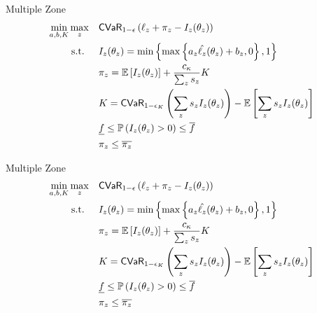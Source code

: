 \documentclass{beamer}
\begin{document}
\begin{frame}{Multiple Zone}
    \begin{align}
        \min_{a,b,K} \max_z &\quad {\sf CVaR}_{1-\epsilon}\left (\ell_z  + \pi_z - I_z(\theta_z) \right )\\
        \text{s.t.   } &\quad I_z(\theta_z) = \min \left \{ \max \left \{ a_z\hat{\ell_z}(\theta_z) + b_z,0 \right \},1 \right \} \\
        &\quad \pi_z  = \mathbb{E}\left [ I_z(\theta_z) \right ] + \frac{c_{\kappa}}{\sum_z s_z} K\\
        &\quad K =  {\sf CVaR}_{1-\epsilon_K} \left ( \sum_z s_z I_z(\theta_z) \right ) - \mathbb{E}\left [ \sum_z s_zI_z(\theta_z) \right ] \\
        & \quad \underline{f} \leq \mathbb{P}\left ( I_z(\theta_z) > 0 \right ) \leq \overline{f}\\
        &\quad\pi_z \leq \overline{\pi_z}
      \end{align}
\end{frame}

\begin{frame}[noframenumbering]{Multiple Zone}
    \begin{align}
        \min_{a,b,K} \max_z &\quad {\sf CVaR}_{1-\epsilon}\left (\ell_z  + \pi_z - I_z(\theta_z) \right )\\
        \text{s.t.   } &\quad I_z(\theta_z) = \min \left \{ \max \left \{ a_z\hat{\ell_z}(\theta_z) + b_z,0 \right \},1 \right \} \\
        &\quad \pi_z  = \mathbb{E}\left [ I_z(\theta_z) \right ] + \frac{c_{\kappa}}{\sum_z s_z} K\\
        &\quad K =  {\sf CVaR}_{1-\epsilon_K} \left ( \sum_z s_z I_z(\theta_z) \right ) - \mathbb{E}\left [ \sum_z s_zI_z(\theta_z) \right ] \\
        & \quad \underline{f} \leq \mathbb{P}\left ( I_z(\theta_z) > 0 \right ) \leq \overline{f}\\
        &\quad\pi_z \leq \overline{\pi_z}
      \end{align}
\end{frame}
\end{document}
